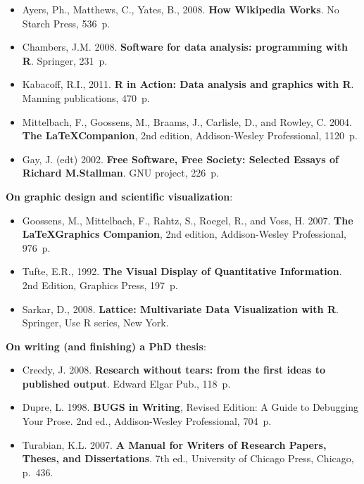 \documentclass[graybox,envcountchap,sectrefs,UStrade]{svmono}
\begin{document}
\begin{itemize}
\renewcommand{\labelitemi}{$\bigstar$}
  \item Ayers, Ph., Matthews, C., Yates, B., 2008. \textbf{How Wikipedia Works}. No Starch Press, 536~p.
  \item Chambers, J.M. 2008. \textbf{Software for data analysis: programming with R}. Springer, 231~p.
  \item Kabacoff, R.I., 2011. \textbf{R in Action: Data analysis and graphics with R}. Manning publications, 470~p.
  \item Mittelbach, F., Goossens, M., Braams, J., Carlisle, D., and Rowley, C. 2004. \textbf{The \LaTeX Companion}, 2nd edition, Addison-Wesley Professional, 1120~p.
  \item Gay, J. (edt) 2002. \textbf{Free Software, Free Society: Selected Essays of Richard M.\@ Stallman}. GNU project, 226~p.
\end{itemize}

\bigskip
\noindent \textbf{On graphic design and scientific visualization}:

\begin{itemize}
\renewcommand{\labelitemi}{$\bigstar$}
  \item Goossens, M., Mittelbach, F., Rahtz, S., Roegel, R., and Voss, H. 2007. \textbf{The \LaTeX Graphics Companion}, 2nd edition, Addison-Wesley Professional, 976~p.
  \item Tufte, E.R., 1992. \textbf{The Visual Display of Quantitative Information}. 2nd Edition, Graphics Press, 197~p.
  \item Sarkar, D., 2008. \textbf{Lattice: {M}ultivariate Data Visualization with {R}}. Springer, Use R series, New York.
\end{itemize}

\bigskip
\noindent \textbf{On writing (and finishing) a PhD thesis}:

\begin{itemize}
\renewcommand{\labelitemi}{$\bigstar$}
  \item Creedy, J. 2008. \textbf{Research without tears: from the first ideas to published output}. Edward Elgar Pub., 118~p.
  \item Dupre, L. 1998. \textbf{BUGS in Writing}, Revised Edition: A Guide to Debugging Your Prose. 2nd ed., Addison-Wesley Professional, 704~p.
  \item Turabian, K.L. 2007. \textbf{A Manual for Writers of Research Papers, Theses, and Dissertations}. 7th ed., University of Chicago Press, Chicago, p.~436.
\end{itemize}
\end{document}
